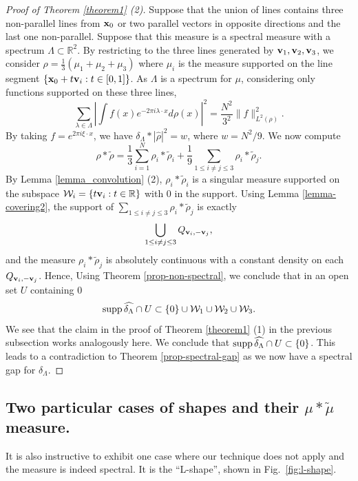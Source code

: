 \documentclass[12pt,a4paper,oneside]{amsart}
\theoremstyle{definition}
\newcommand{\RR}{{\mathbb R}}
\newcommand{\supp}{{\rm supp\,}}
\newcommand{\ft}[1]{\widehat{#1}}
\newcommand{\wt}[1]{\widetilde{#1}}
\newcommand{\red}[1]{\textcolor{red}{{#1}}}
\newcounter{rem}
\begin{document}
\begin{proof}[Proof of Theorem \ref{theorem1} (2)]  Suppose that the union of lines contains three non-parallel lines from ${\bf x}_0$ or two parallel vectors in opposite directions and the last one non-parallel. Suppose that this measure is a spectral measure with a spectrum $\Lambda\subset \RR^2$. By restricting to the three lines generated by ${\bf v}_1,{\bf v}_2,{\bf v}_3$, we consider $\rho = \frac13(\mu_1+\mu_2+\mu_3)$ where $\mu_i$ is the measure supported on the {line segment} $\{{\bf x}_0+t{\bf v}_i: t\in[0,1]\}$. As $\Lambda$ is a spectrum for $\mu$, considering only functions supported on these three lines,
$$
\sum_{\lambda\in\Lambda} \left|\int f(x)e^{-2\pi i \lambda\cdot x}d\rho (x)\right|^2  = \frac{N^2}{3^2} \|f\|^2_{L^2(\rho)}.
$$
By taking $f = e^{2\pi i \xi\cdot x}$, we have $\delta_{\Lambda}\ast |\ft{\rho}|^2 = w$, where $w= N^2/9$. We now compute 
  $$
 \rho\ast\wt{\rho} = \frac1{3}\sum_{i=1}^N\rho_i\ast\wt\rho_i+ \frac{1}{9}\sum_{1\le i\ne j\le 3} \rho_i\ast\wt\rho_j.
$$
By Lemma \ref{lemma_convolution} (2), $\rho_{i}\ast\wt{\rho}_i$ is a singular measure supported on the subspace ${\mathcal W}_i = \{t{\bf v}_i: t\in\RR\}$ with $0$ in the support. Using Lemma \ref{lemma-covering2}, the support of $\sum_{1\le i\ne j\le 3} \rho_i\ast\wt\rho_j$ is exactly 
$$
\bigcup_{1\le i\ne j\le 3} Q_{{\bf v}_i,-{\bf v}_j}, 
$$
and the measure $\rho_i\ast\wt\rho_j$ is absolutely continuous with  a constant density on each  $Q_{{\bf v}_i,-{\bf v}_j}$. Hence,  Using Theorem \ref{prop-non-spectral}, we conclude that in an open set $U$ containing $0$
$$
\supp \ft{\delta_{\Lambda}}\cap U \subset \{0\}\cup {\mathcal W}_1\cup{\mathcal W}_2\cup {\mathcal W}_3.
$$
We see that the claim in the proof of Theorem \ref{theorem1} (1) in the previous subsection works analogously here.  We conclude that $\supp \ft{\delta_{\Lambda}}\cap U \subset \{0\}$. This leads to a contradiction to Theorem \ref{prop-spectral-gap} as we now have a spectral gap for $\delta_{\Lambda}$.
\end{proof}


\subsection{Two particular cases of shapes and their $\mu*\wt \mu$ measure.}\label{ss:two-cases}
It is also instructive to exhibit one case where our technique does not apply and the measure is indeed spectral. It is the ``L-shape'', shown in Fig.\ \ref{fig:l-shape}.
\end{document}
